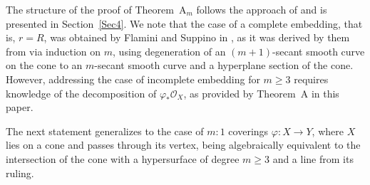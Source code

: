 \documentclass[a4paper,12pt]{amsart}
\begin{document}
\medskip

The structure of the proof of \textnormal{Theorem~A$_m$}  follows the approach of \cite[Theorem~A]{CIK21} and is presented in Section~\ref{Sec4}. We note that the case of a complete embedding, that is, $r = R$, was obtained by Flamini and Suppino in \cite{FS23}, as it was derived by them from \cite[Theorem~A]{CIK21} via induction on $m$, using degeneration of an $(m+1)$-secant smooth curve on the cone to an $m$-secant smooth curve and a hyperplane section of the cone. However, addressing the case of incomplete embedding for $m \geq 3$ requires knowledge of the decomposition of $\varphi_{\ast} \mathcal{O}_X$,  as provided by \textnormal{Theorem~A} in this paper.

The next statement generalizes \cite[The Main Theorem]{CIK24b} to the case of $m:1$ coverings $\varphi : X \to Y$, where $X$ lies on a cone and passes through its vertex, being algebraically equivalent to the intersection of the cone with a hypersurface of degree $m \geq 3$ and a line from its ruling.
\end{document}
